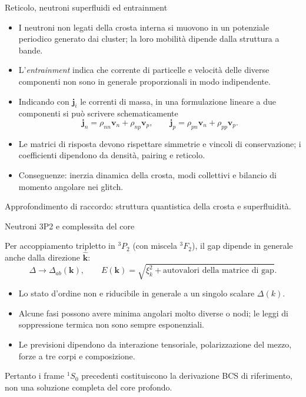 \begin{frame}[t]{Reticolo, neutroni superfluidi ed entrainment}
\vspace*{3mm}
\small
\begin{itemize}
\item I neutroni non legati della crosta interna si muovono in un potenziale periodico generato dai cluster; la loro mobilità dipende dalla struttura a bande.
\item L'\emph{entrainment} indica che corrente di particelle e velocità delle diverse componenti non sono in generale proporzionali in modo indipendente.
\item Indicando con $\mathbf j_i$ le correnti di massa, in una formulazione
lineare a due componenti si può scrivere schematicamente
\[
\mathbf j_n=\rho_{nn}\mathbf v_n+\rho_{np}\mathbf v_p,
\qquad
\mathbf j_p=\rho_{pn}\mathbf v_n+\rho_{pp}\mathbf v_p.
\]
\item Le matrici di risposta devono rispettare simmetrie e vincoli di conservazione; i coefficienti dipendono da densità, pairing e reticolo.
\item Conseguenze: inerzia dinamica della crosta, modi collettivi e bilancio di momento angolare nei glitch.
\end{itemize}
{\footnotesize Approfondimento di raccordo: struttura quantistica della crosta e superfluidità.}
\end{frame}

\begin{frame}[t]{Neutroni 3P2 e complessita del core}
\vspace*{3mm}
\small

Per accoppiamento tripletto in ${}^3P_2$ (con miscela ${}^3F_2$), il gap dipende in generale anche dalla direzione $\hat{\mathbf k}$:
\[
\Delta\to\Delta_{ab}(\mathbf k),\qquad
E(\mathbf k)=\sqrt{\xi_k^2+\text{autovalori della matrice di gap}}.
\]
\begin{itemize}
\item Lo stato d'ordine non e riducibile in generale a un singolo scalare $\Delta(k)$.
\item Alcune fasi possono avere minima angolari molto diverse o nodi; le leggi di soppressione termica non sono sempre esponenziali.
\item Le previsioni dipendono da interazione tensoriale, polarizzazione del mezzo, forze a tre corpi e composizione.
\end{itemize}
Pertanto i frame ${}^1S_0$ precedenti costituiscono la derivazione BCS di riferimento, non una soluzione completa del core profondo.
\end{frame}

